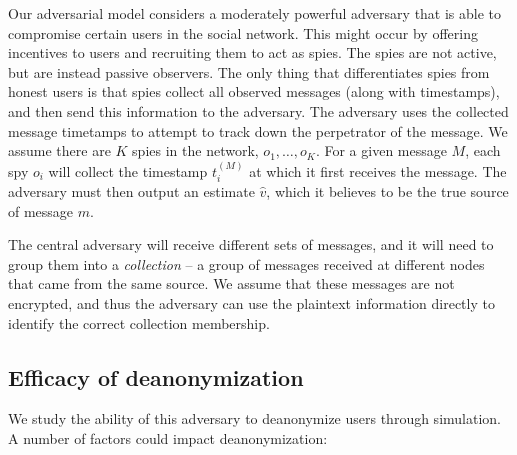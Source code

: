 Our adversarial model considers a moderately powerful adversary that is able to compromise certain users in the social network. This might occur by offering incentives to users and recruiting them to act as spies. The spies are not active, but are instead passive observers. The only thing that differentiates spies from honest users is that spies collect all observed messages (along with timestamps), and then send this information to the adversary. The adversary uses the collected message timetamps to attempt to track down the perpetrator of the message.
We assume there are $K$ spies in the network, $o_1,\ldots,o_K$. For a given message $M$, each spy $o_i$ will collect the timestamp $t_i^{(M)}$ at which it first receives the message. The adversary must then output an estimate $\hat v$, which it believes to be the true source of message $m$. %

The central adversary will receive different sets of messages, and it will need to group them into a \emph{collection} -- a group of messages received at different nodes that came from the same source. We assume that these messages are not encrypted, and thus the adversary can use the plaintext information directly to identify the correct collection membership. 

\subsection{Efficacy of deanonymization}

We study the ability of this adversary to deanonymize users through simulation. A number of factors could impact deanonymization:

